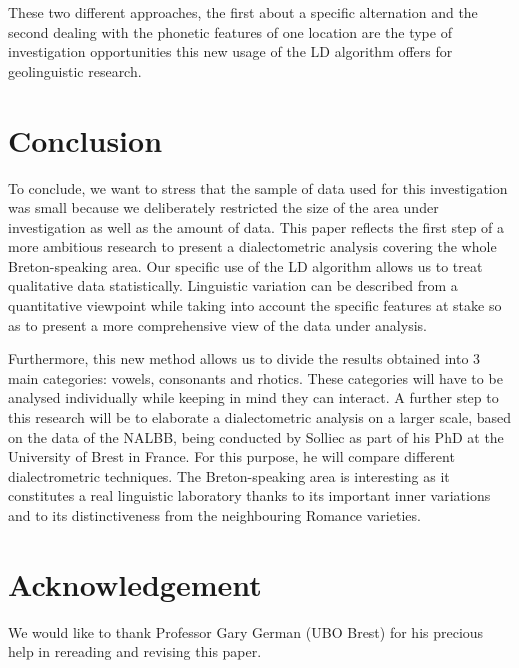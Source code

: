 \documentclass[output=paper]{LSP/langsci}
\begin{document}
These two different approaches, the first about a specific alternation and the second dealing with the phonetic features of one location are the type of investigation opportunities this new usage of the LD algorithm offers for geolinguistic research. 

\section{Conclusion}

To conclude, we want to stress that the sample of data used for this investigation was small because we deliberately restricted the size of the area under investigation as well as the amount of data. This paper reflects the first step of a more ambitious research to present a dialectometric analysis covering the whole Breton-speaking area. Our specific use of the LD algorithm allows us to treat qualitative data statistically. Linguistic variation can be described from a quantitative viewpoint while taking into account the specific features at stake so as to present a more comprehensive view of the data under analysis.

Furthermore, this new method allows us to divide the results obtained into 3 main categories: vowels, consonants and rhotics. These categories will have to be analysed individually while keeping in mind they can interact. A further step to this research will be to elaborate a dialectometric analysis on a larger scale, based on the data of the NALBB, being conducted by Solliec as part of his PhD at the University of Brest in France. For this purpose, he will compare different dialectrometric techniques. The Breton-speaking area is interesting as it constitutes a real linguistic laboratory thanks to its important inner variations and to its distinctiveness from the neighbouring Romance varieties.

\section*{Acknowledgement}
We would like to thank Professor Gary German (UBO Brest) for his precious help in rereading and revising this paper.

\printbibliography[heading=subbibliography,notkeyword=this]
\end{document}
